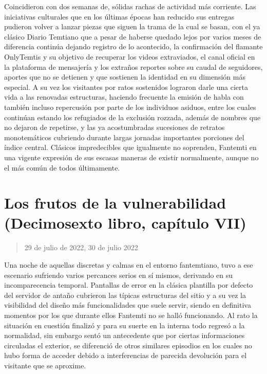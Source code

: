 \documentclass[
]{book}
\begin{document}
Coincidieron con dos semanas de, sólidas rachas de actividad más corriente. Las iniciativas culturales que en los últimas épocas han reducido sus entregas pudieron volver a lanzar piezas que siguen la trama de la cual se basan, con el ya clásico Diario Temtiano que a pesar de haberse quedado lejos por varios meses de diferencia continúa dejando registro de lo acontecido, la confirmación del flamante OnlyTemtis y su objetivo de recuperar los videos extraviados, el canal oficial en la plataforma de mensajería y los extraños reportes sobre su caudal de seguidores, aportes que no se detienen y que sostienen la identidad en su dimensión más especial. A su vez los visitantes por ratos sostenidos lograron darle una cierta vida a las renovadas estructuras, haciendo frecuente la emisión de habla con también incluso repercusión por parte de los individuos asiduos, entre los cuales continúan estando los refugiados de la exclusión rozzada, además de nombres que no dejaron de repetirse, y las ya acostumbradas sucesiones de retratos monotemáticos cubriendo durante largas jornadas importantes porciones del índice central. Clásicos impredecibles que igualmente no soprenden, Fantemti en una vigente expresión de sus escasas maneras de existir normalmente, aunque no el más común de todos últimamente.

\hypertarget{los-frutos-de-la-vulnerabilidad-decimosexto-libro-capuxedtulo-vii}{%
\section{Los frutos de la vulnerabilidad (Decimosexto libro, capítulo VII)}\label{los-frutos-de-la-vulnerabilidad-decimosexto-libro-capuxedtulo-vii}}

\begin{quote}
29 de julio de 2022, 30 de julio 2022
\end{quote}

Una noche de aquellas discretas y calmas en el entorno fantemtiano, tuvo a ese escenario sufriendo varios percances serios en sí mismos, derivando en su incomparecencia temporal. Pantallas de error en la clásica plantilla por defecto del servidor de antaño cubrieron las típicas estructuras del sitio y a su vez la visibilidad del diseño más funcionalidades que suele servir, siendo en definitiva momentos por los que durante ellos Fantemti no se halló funcionando. Al rato la situación en cuestión finalizó y para su suerte en la interna todo regresó a la normalidad, sin embargo sentó un antecedente que por ciertas informaciones circuladas el exterior, se diferenció de otros similares episodios en los cuales no hubo forma de acceder debido a interferencias de parecida devolución para el visitante que se aproxime.
\end{document}
